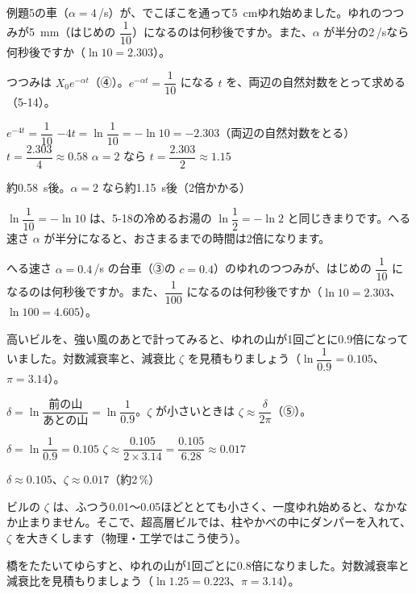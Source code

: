 \begin{reidai}
例題5の車（$\alpha=4$\,/s）が、でこぼこを通って\qty{5}{cm}ゆれ始めました。ゆれのつつみが\qty{5}{mm}（はじめの $\dfrac{1}{10}$）になるのは何秒後ですか。また、$\alpha$ が半分の2\,/sなら何秒後ですか（$\ln10=2.303$）。\par
\kangaekata つつみは $X_0e^{-\alpha t}$（④）。$e^{-\alpha t}=\dfrac{1}{10}$ になる $t$ を、両辺の自然対数をとって求める（5-14）。\par
\shiki
\kviha $e^{-4t}=\dfrac{1}{10}$
\kviha $-4t=\ln\dfrac{1}{10}=-\ln10=-2.303$（両辺の自然対数をとる）
\kviha $t=\dfrac{2.303}{4}\approx0.58$
\kviha $\alpha=2$ なら $t=\dfrac{2.303}{2}\approx1.15$\par
\kotae 約\qty{0.58}{s}後。$\alpha=2$ なら約\qty{1.15}{s}後（2倍かかる）
\end{reidai}
$\ln\dfrac{1}{10}=-\ln10$ は、5-18の冷めるお湯の $\ln\dfrac{1}{2}=-\ln2$ と同じきまりです。へる速さ $\alpha$ が半分になると、おさまるまでの時間は2倍になります。

\begin{jibun}
へる速さ $\alpha=0.4$\,/s の台車（③の $c=0.4$）のゆれのつつみが、はじめの $\dfrac{1}{10}$ になるのは何秒後ですか。また、$\dfrac{1}{100}$ になるのは何秒後ですか（$\ln10=2.303$、$\ln100=4.605$）。
\end{jibun}

\begin{reidai}[山の比から減衰比を見積もる]
高いビルを、強い風のあとで計ってみると、ゆれの山が1回ごとに0.9倍になっていました。対数減衰率と、減衰比 $\zeta$ を見積もりましょう（$\ln\dfrac{1}{0.9}=0.105$、$\pi=3.14$）。\par
\kangaekata $\delta=\ln\dfrac{\text{前の山}}{\text{あとの山}}=\ln\dfrac{1}{0.9}$。$\zeta$ が小さいときは $\zeta\approx\dfrac{\delta}{2\pi}$（⑤）。\par
\shiki
\kviha $\delta=\ln\dfrac{1}{0.9}=0.105$
\kviha $\zeta\approx\dfrac{0.105}{2\times3.14}=\dfrac{0.105}{6.28}\approx0.017$\par
\kotae $\delta\approx0.105$、$\zeta\approx0.017$（約2\,\%）
\end{reidai}
ビルの $\zeta$ は、ふつう0.01〜0.05ほどととても小さく、一度ゆれ始めると、なかなか止まりません。そこで、超高層ビルでは、柱やかべの中にダンパーを入れて、$\zeta$ を大きくします（物理・工学ではこう使う）。

\begin{jibun}
橋をたたいてゆらすと、ゆれの山が1回ごとに0.8倍になりました。対数減衰率と減衰比を見積もりましょう（$\ln1.25=0.223$、$\pi=3.14$）。
\end{jibun}

